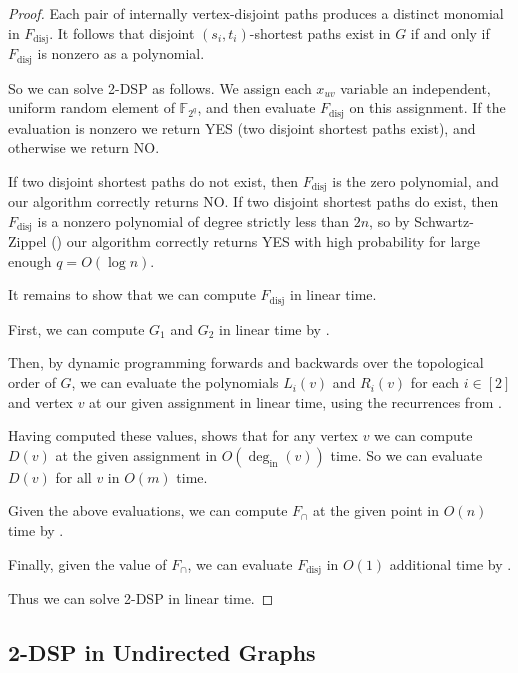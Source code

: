 \documentclass[11pt]{article}
\DeclareMathOperator{\disj}{disj}
\theoremstyle{definition}
\begin{document}
\twodspDAG*
\begin{proof}
    Each pair of internally vertex-disjoint paths produces a distinct monomial in $F_{\disj}$.
    It follows that disjoint $(s_i,t_i)$-shortest paths exist in $G$ if and only if $F_{\disj}$ is nonzero as a polynomial.

    So we can solve \textsf{2-DSP} as follows.
    We assign each $x_{uv}$ variable an independent, uniform random element of $\mathbb{F}_{2^q}$, and then evaluate $F_{\disj}$ on this assignment.
    If the evaluation is nonzero we return YES (two disjoint shortest paths exist), and otherwise we return NO.
    
    If two disjoint shortest paths do not exist, then $F_{\disj}$ is the zero polynomial, and our algorithm correctly returns NO.
    If two disjoint shortest paths do exist, then $F_{\disj}$ is a nonzero polynomial of degree strictly less than $2n$, so by Schwartz-Zippel () our algorithm correctly returns YES with high probability for large enough $q = O(\log n)$.

    It remains to show that we can compute $F_{\disj}$ in linear time.

    First, we can compute $G_1$ and $G_2$ in linear time by .
    
    Then, by dynamic programming forwards and backwards over the topological order of $G$, we can evaluate the polynomials  $L_i(v)$   and $R_i(v)$ for each $i\in [2]$ and vertex $v$ at our given assignment in linear time, using the recurrences from .
    
    Having computed these values,  shows that for any vertex $v$ we can compute $D(v)$ at the given assignment in $O(\deg_{\text{in}}(v))$ time.
    So we can evaluate $D(v)$ for all $v$ in $O(m)$ time.
    
    Given the above evaluations, we can compute $F_{\cap}$ at the given point in $O(n)$  time by .
    
     Finally, given the value of $F_{\cap}$, we can evaluate $F_{\disj}$ in $O(1)$ additional time by .

     Thus we can solve \textsf{2-DSP} in linear time.
\end{proof}


\subsection{2-DSP in Undirected Graphs}
\label{subsec:2dsp-undir-alg}
\end{document}
